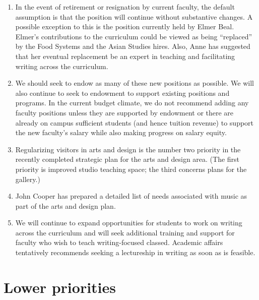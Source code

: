 \documentclass[12pt]{article}
\begin{document}
\begin{enumerate}

\item In the event of retirement or resignation by current faculty,
the default assumption is that the position will continue without
substantive changes.  A possible exception to this is the position
currently held by Elmer Beal.  Elmer's contributions to the curriculum
could be viewed as being ``replaced'' by the Food Systems and the Asian
Studies hires.  Also, Anne has suggested that her eventual replacement
be an expert in teaching and facilitating writing across the
curriculum. 

\item We should seek to endow as many of these new positions as
possible.  We will also continue to seek to endowment to support
existing positions and programs.  In the current budget climate, we do
not recommend adding any faculty positions unless they are supported
by endowment or there are already on campus sufficient students (and
hence tuition revenue) to support the new faculty's salary while also
making progress on salary equity. 

\item Regularizing visitors in arts and design is the number two
priority in the recently completed strategic plan for the arts and
design area.  (The first priority is improved studio teaching space;
the third concerns plans for the gallery.)

\item John Cooper has prepared a detailed list of needs associated
with music as part of the arts and design plan. 

\item We will continue to expand opportunities for students to work on
writing across the curriculum and will seek additional training and
support for faculty who wish to teach writing-focused classed.
Academic affairs tentatively recommends seeking a lectureship in
writing as soon as is feasible. 


\end{enumerate}



\section{Lower priorities}
\end{document}
